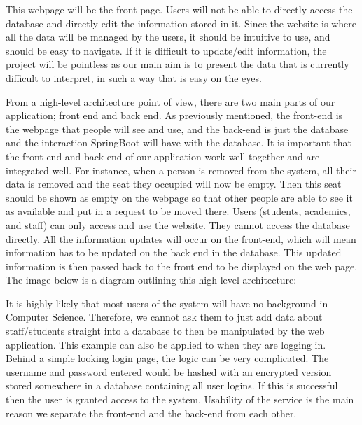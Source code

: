 \documentclass[11pt,a4paper]{article}
\begin{document}
This webpage will be the front-page. Users will not be able to directly access the database and directly edit the information stored in it. Since the website is where all the data will be managed by the users, it should be intuitive to use, and should be easy to navigate. If it is difficult to update/edit information, the project will be pointless as our main aim is to present the data that is currently difficult to interpret, in such a way that is easy on the eyes.
\bigskip

From a high-level architecture point of view, there are two main parts of our application; front end and back end. As previously mentioned, the front-end is the webpage that people will see and use, and the back-end is just the database and the interaction SpringBoot will have with the database. It is important that the front end and back end of our application work well together and are integrated well. For instance, when a person is removed from the system, all their data is removed and the seat they occupied will now be empty. Then this seat should be shown as empty on the webpage so that other people are able to see it as available and put in a request to be moved there. Users (students, academics, and staff) can only access and use the website. They cannot access the database directly. All the information updates will occur on the front-end, which will mean information has to be updated on the back end in the database. This updated information is then passed back to the front end to be displayed on the web page. The image below is a diagram outlining this high-level architecture:
\bigskip

It is highly likely that most users of the system will have no background in Computer Science. Therefore, we cannot ask them to just add data about staff/students straight into a database to then be manipulated by the web application. This example can also be applied to when they are logging in. Behind a simple looking login page, the logic can be very complicated. The username and password entered would be hashed with an encrypted version stored somewhere in a database containing all user logins. If this is successful then the user is granted access to the system. Usability of the service is the main reason we separate the front-end and the back-end from each other. 
\bigskip
\end{document}
